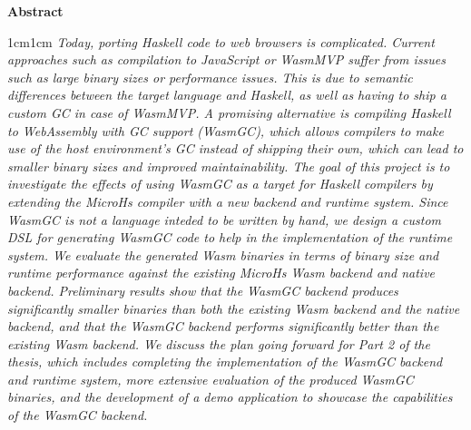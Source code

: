 \begin{center}
    \headingfont\huge\bfseries{Abstract}
\end{center}
\begin{changemargin}{1cm}{1cm}
\textit{Today, porting Haskell code to web browsers is complicated. Current approaches such as compilation to JavaScript or WasmMVP suffer from issues such as large binary sizes or performance issues. This is due to semantic differences between the target language and Haskell, as well as having to ship a custom GC in case of WasmMVP. A promising alternative is compiling Haskell to WebAssembly with GC support (WasmGC), which allows compilers to make use of the host environment's GC instead of shipping their own, which can lead to smaller binary sizes and improved maintainability. The goal of this project is to investigate the effects of using WasmGC as a target for Haskell compilers by extending the MicroHs compiler with a new backend and runtime system. Since WasmGC is not a language inteded to be written by hand, we design a custom DSL for generating WasmGC code to help in the implementation of the runtime system. We evaluate the generated Wasm binaries in terms of binary size and runtime performance against the existing MicroHs Wasm backend and native backend. Preliminary results show that the WasmGC backend produces significantly smaller binaries than both the existing Wasm backend and the native backend, and that the WasmGC backend performs significantly better than the existing Wasm backend. We discuss the plan going forward for Part 2 of the thesis, which includes completing the implementation of the WasmGC backend and runtime system, more extensive evaluation of the produced WasmGC binaries, and the development of a demo application to showcase the capabilities of the WasmGC backend.}
\end{changemargin}